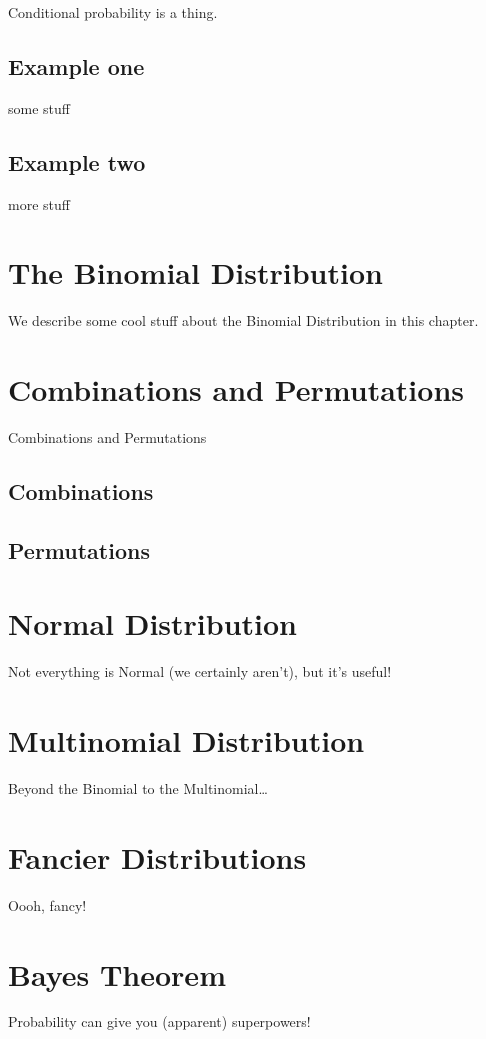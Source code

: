 \documentclass[]{book}
\theoremstyle{definition}
\theoremstyle{definition}
\theoremstyle{definition}
\theoremstyle{remark}
\begin{document}
Conditional probability is a thing.

\section{Example one}\label{example-one}

some stuff

\section{Example two}\label{example-two}

more stuff

\chapter{The Binomial Distribution}\label{the-binomial-distribution}

We describe some cool stuff about the Binomial Distribution in this
chapter.

\chapter{Combinations and
Permutations}\label{combinations-and-permutations}

Combinations and Permutations

\section{Combinations}\label{combinations}

\section{Permutations}\label{permutations}

\chapter{Normal Distribution}\label{normal}

Not everything is Normal (we certainly aren't), but it's useful!

\chapter{Multinomial Distribution}\label{multinom}

Beyond the Binomial to the Multinomial\ldots{}

\chapter{Fancier Distributions}\label{fancy}

Oooh, fancy!

\chapter{Bayes Theorem}\label{bayes}

Probability can give you (apparent) superpowers!


\end{document}
